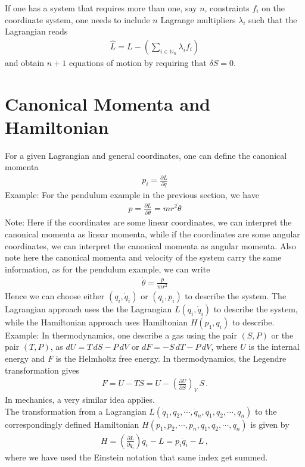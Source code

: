 \documentclass[11pt, onesided]{book}
\theoremstyle{break}
\theoremstyle{break}
\newcommand{\N}{\mathbb{N}}
\newcommand{\pd}{\partial}
\newcommand{\note}{\color{red}Note: \color{black}}
\newcommand{\example}{\color{green}Example: \color{black}}
\begin{document}
If one has a system that requires more than one, say $n$, constraints $f_i$ on the coordinate system, one needs to include $n$ Lagrange multipliers $\lambda_i$ such that the Lagrangian reads
\begin{align*}
\hat{L} = L -\left( \sum_{i\in \N_n}\lambda_if_i\right)
\end{align*}
and obtain $n+1$ equations of motion by requiring that $\delta S = 0$. 

\section[Canonical Momenta and Hamiltonian]{\color{red} Canonical Momenta and Hamiltonian\color{black}}
For a given Lagrangian and general coordinates, one can define the canonical momenta
\begin{align}
p_i = \frac{\pd L}{\pd \dot{q}}
\end{align}
\example For the pendulum example in the previous section, we have 
\begin{align*}
p = \frac{\pd L}{\pd \dot{\theta}} = mr^2 \dot{\theta}
\end{align*}
\note Here if the coordinates are some linear coordinates, we can interpret the canonical momenta as linear momenta, while if the coordinates are some angular coordinates, we can interpret the canonical momenta as angular momenta. Also note here the canonical momenta and velocity of the system carry the same information, as for the pendulum example, we can write
\begin{align*}
\dot{\theta} = \frac{p}{mr^2}
\end{align*}
Hence we can choose either $(q_i,\dot{q}_i)$ or $(q_i, p_i)$ to describe the system. The Lagrangian approach uses the the Lagrangian $L(q_i,\dot{q}_i)$ to describe the system, while the Hamiltonian approach uses Hamiltonian $H(p_1,q_i)$ to describe. \\


\example In thermodynamics, one describe a gas using the pair $(S,P)$ or the pair $(T,P)$, as $dU = T\,dS - P\,dV$ or $dF = -S\,dT - P\, dV$, where $U$ is the internal energy and $F$ is the Helmholtz free energy. In thermodynamics, the Legendre transformation gives
\begin{align*}
F = U - TS = U - \left( \frac{\pd U}{\pd S}\right)_V \, S\,.
\end{align*}
In mechanics, a very similar idea applies.\\

The transformation from a Lagrangian $L(\dot{q}_1, \dot{q}_2,\cdots, \dot{q}_n, q_1,q_2,\cdots, q_n)$ to the correspondingly defined Hamiltonian $H(p_1,p_2,\cdots, p_n, q_1,q_2,\cdots, q_n)$ is given by
\begin{align}
H  = \left( \frac{\pd L}{\pd \dot{q}_i}\right) \dot{q}_i -L = p_i \dot{q}_i - L\,,
\end{align}
where we have used the Einstein notation that same index get summed.\\
\end{document}
